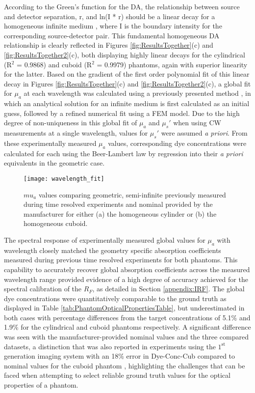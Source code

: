 \documentclass[twoside]{bhamthesis}
\theoremstyle{definition}
\begin{document}
According to the Green's function for the DA, the relationship between source and detector separation, r, and ln(I * r) should be a linear decay for a homogeneous infinite medium \cite{patterson1989quantitative}, where I is the boundary intensity for the corresponding source-detector pair. This fundamental homogeneous DA relationship is clearly reflected in Figures \ref{fig:ResultsTogether}(c) and \ref{fig:ResultsTogether2}(c), both displaying highly linear decays for the cylindrical (R$^2$  = 0.9868) and cuboid (R$^2$ = 0.9979) phantoms, again with superior linearity for the latter. Based on the gradient of the first order polynomial fit of this linear decay in Figures \ref{fig:ResultsTogether}(c) and \ref{fig:ResultsTogether2}(c), a global fit for $\mu_a$ at each wavelength was calculated using a previously presented method \cite{mcbride2003strategies}, in which an analytical solution for an infinite medium is first calculated as an initial guess, followed by a refined numerical fit using a FEM model. Due to the high degree of non-uniqueness in this global fit of $\mu_a$ and $\mu_s'$ when using CW measurements at a single wavelength, values for $\mu_s'$ were assumed \textit{a priori}. From these experimentally measured $\mu_a$ values, corresponding dye concentrations were calculated for each using the Beer-Lambert law by regression into their \textit{a priori} equivalents in the geometric case.

\begin{figure}[!ht]
\centering
  \texttt{[image: wavelength\_fit]}
  \caption{$mu_a$ values comparing geometric, semi-infinite previously measured during time resolved experiments \cite{guggenheim2016time} and nominal provided by the manufacturer for either (a) the homogeneous cylinder or (b) the homogeneous cuboid.}
    \label{fig:wavelength_fit}
\end{figure}

The spectral response of experimentally measured global values for $\mu_a$ with wavelength closely matched the geometry specific absorption coefficients measured during previous time resolved experiments \cite{guggenheim2016time} for both phantoms. This capability to accurately recover global absorption coefficients across the measured wavelength range provided evidence of a high degree of accuracy achieved for the spectral calibration of the $R_F$, as detailed in Section \ref{appendix:IRF}. The global dye concentrations were quantitatively comparable to the ground truth as displayed in Table \ref{tab:PhantomOpticalPropertiesTable}, but underestimated in both cases with percentage differences from the target concentrations of 5.1\% and 1.9\% for the cylindrical and cuboid phantoms respectively. A significant difference was seen with the manufacturer-provided nominal values and the three compared datasets, a distinction that was also reported in experiments using the $\mathrm{1^{st}}$ generation imaging system with an 18\% error in Dye-Conc-Cub compared to nominal values for the cuboid phantom \cite{wu2016development}, highlighting the challenges that can be faced when attempting to select reliable ground truth values for the optical properties of a phantom.
\end{document}
